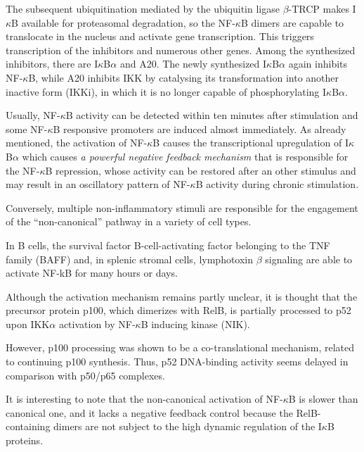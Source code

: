 \documentclass[12pt,a4paper]{report}
\begin{document}
The subsequent ubiquitination mediated by the ubiquitin ligase $\beta$-TRCP makes I$\kappa$B available for
proteasomal degradation, so the NF-$\kappa$B dimers are capable to translocate in the nucleus and
activate gene transcription. This triggers transcription of the inhibitors and numerous other genes. Among the synthesized inhibitors, there are I$\kappa$B$\alpha$ and A20. The newly synthesized I$\kappa$B$\alpha$ again inhibits NF-$\kappa$B, while A20 inhibits IKK by catalysing its transformation into another inactive form (IKKi), in which it is no longer capable of phosphorylating I$\kappa$B$\alpha$.

Usually, NF-$\kappa$B activity can be detected within ten minutes after stimulation and some NF-$\kappa$B responsive promoters are induced almost immediately. As already mentioned, the activation of NF-$\kappa$B causes the transcriptional upregulation of I$\kappa$B$\alpha$ which causes \emph{a powerful negative feedback mechanism} that is responsible for the NF-$\kappa$B repression, whose activity can be restored after an other stimulus and may result in an oscillatory pattern of NF-$\kappa$B activity during chronic stimulation.

Conversely, multiple non-inflammatory stimuli are responsible for the engagement of the “non-canonical” pathway in a variety of cell types.

In B cells, the survival factor B-cell-activating factor belonging to the TNF family (BAFF) and, in splenic stromal cells, lymphotoxin $\beta$ signaling are able to activate NF-kB for many hours or days.

Although the activation mechanism remains partly unclear, it is thought that the precursor protein p100, which dimerizes with RelB, is partially processed to p52 upon IKK$\alpha$ activation by NF-$\kappa$B inducing kinase (NIK).

However, p100 processing was shown to be a co-translational mechanism, related to continuing p100 synthesis. Thus, p52 DNA-binding activity seems
delayed in comparison with p50/p65 complexes.

It is interesting to note that the non-canonical activation of NF-$\kappa$B is slower than canonical one, and it lacks a negative feedback control because the RelB-containing dimers are not subject to the high dynamic regulation of the I$\kappa$B proteins.
\end{document}
